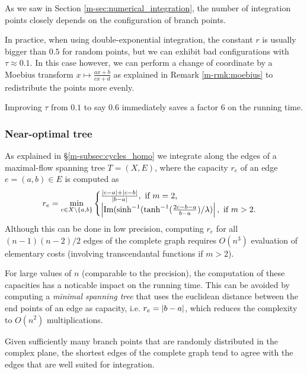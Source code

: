 \documentclass[main.tex]{subfiles}
\begin{document}
   As we saw in Section \ref{m-sec:numerical_integration}, the number of integration points
   closely depends on the configuration of branch points.

   In practice, when using double-exponential integration, the constant $r$ is usually bigger than $0.5$
   for random points, but we can exhibit bad configurations with $τ\approx 0.1$.
   In this case however, we can perform a change of coordinate by a Moebius transform
   $x\mapsto \frac{ax+b}{cx+d}$ as explained in Remark \ref{m-rmk:moebius} to redistribute the points more evenly.

   Improving $τ$ from $0.1$ to say $0.6$ immediately saves a factor $6$ on the running time.

   \subsubsection{Near-optimal tree}
    As explained in \S \ref{m-subsec:cycles_homo} we integrate along the edges of a maximal-flow spanning tree $T = (X,E)$, where the capacity $r_e$ of an edge $e = (a,b) \in E$ is computed as
    \begin{equation*}
     r_e =  \min_{c \in X \setminus \{ a,b\}} \begin{cases}
         \frac{\left|c-a\right|+\left|c-b\right|}{\left|b-a\right|}, \text{ if $m=2$,}\\
         \left| \operatorname{Im}(\sinh^{-1}(\tanh^{-1}(\frac{2c - b -a}{b-a})/\lambda) \right|, \text{ if $m>2$.}
            \end{cases}
    \end{equation*}
    Although this can be done in low precision, computing $r_e$ for all $(n-1)(n-2)/2$ edges of the complete graph
    requires $O(n^3)$ evaluation of elementary costs (involving transcendantal functions if $m>2$).

    For large values of $n$ (comparable to the precision), the computation of
    these capacities has a noticable impact on the running time. This can be
    avoided by computing a \emph{minimal spanning tree} that uses the euclidean
    distance between the end points of an edge as capacity, i.e.
    $r_e = \left|b-a\right|$, which reduces the complexity to $O(n^2)$
    multiplications.

    Given sufficiently many branch points that are randomly distributed in the
    complex plane, the shortest edges of the complete graph tend to agree with
    the edges that are well suited for integration.
\end{document}
